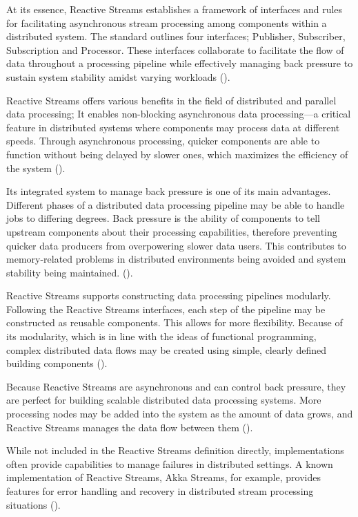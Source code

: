 At its essence, Reactive Streams establishes a framework of interfaces and rules for facilitating asynchronous stream processing among components within a distributed system. The standard outlines four interfaces; Publisher, Subscriber, Subscription and Processor. These interfaces collaborate to facilitate the flow of data throughout a processing pipeline while effectively managing back pressure to sustain system stability amidst varying workloads (\cite{kuhnReactiveDesignPatterns2017})\footnotemark[33].

Reactive Streams offers various benefits in the field of distributed and parallel data processing; It enables non-blocking asynchronous data processing—a critical feature in distributed systems where components may process data at different speeds. Through asynchronous processing, quicker components are able to function without being delayed by slower ones, which maximizes the efficiency of the system (\cite{kuhnReactiveDesignPatterns2017})\footnotemark[33].

Its integrated system to manage back pressure is one of its main advantages. Different phases of a distributed data processing pipeline may be able to handle jobs to differing degrees. Back pressure is the ability of components to tell upstream components about their processing capabilities, therefore preventing quicker data producers from overpowering slower data users. This contributes to memory-related problems in distributed environments being avoided and system stability being maintained.
 (\cite{kuhnReactiveDesignPatterns2017})\footnotemark[33].

Reactive Streams supports constructing data processing pipelines modularly. Following the Reactive Streams interfaces, each step of the pipeline may be constructed as reusable components. This allows for more flexibility. Because of its modularity, which is in line with the ideas of functional programming, complex distributed data flows may be created using simple, clearly defined building components (\cite{kuhnReactiveDesignPatterns2017})\footnotemark[33].

Because Reactive Streams are asynchronous and can control back pressure, they are perfect for building scalable distributed data processing systems. More processing nodes may be added into the system as the amount of data grows, and Reactive Streams manages the data flow between them (\cite{kuhnReactiveDesignPatterns2017})\footnotemark[33].

While not included in the Reactive Streams definition directly, implementations often provide capabilities to manage failures in distributed settings. A known implementation of Reactive Streams, Akka Streams, for example, provides features for error handling and recovery in distributed stream processing situations (\cite{kuhnReactiveDesignPatterns2017})\footnotemark[33].

